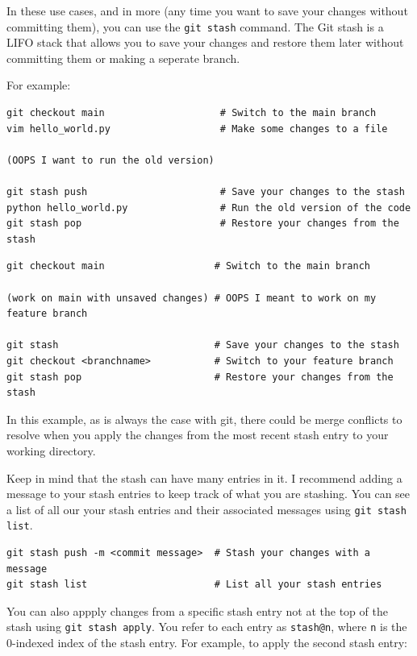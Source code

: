 \documentclass[fleqn]{article}
\begin{document}
In these use cases, and in more (any time you want to save your changes without
committing them), you can use the \texttt{git stash} command. The Git stash is 
a LIFO stack that allows you to save your changes and restore them later
without committing them or making a seperate branch.

For example:

\begin{lstlisting}
git checkout main                    # Switch to the main branch
vim hello_world.py                   # Make some changes to a file

(OOPS I want to run the old version)

git stash push                       # Save your changes to the stash
python hello_world.py                # Run the old version of the code
git stash pop                        # Restore your changes from the stash
\end{lstlisting}

\begin{lstlisting}
git checkout main                   # Switch to the main branch

(work on main with unsaved changes) # OOPS I meant to work on my feature branch

git stash                           # Save your changes to the stash
git checkout <branchname>           # Switch to your feature branch
git stash pop                       # Restore your changes from the stash
\end{lstlisting}

In this example, as is always the case with git, there could be merge conflicts
to resolve when you apply the changes from the most recent stash entry to your
working directory.

Keep in mind that the stash can have many entries in it. I recommend adding a
message to your stash entries to keep track of what you are stashing. You can 
see a list of all our your stash entries and their associated messages using
\texttt{git stash list}.

\begin{lstlisting}
git stash push -m <commit message>  # Stash your changes with a message
git stash list                      # List all your stash entries
\end{lstlisting}

You can also appply changes from a specific stash entry not at the top of the
stash using \texttt{git stash apply}. You refer to each entry as
\texttt{stash@n}, where \texttt{n} is the 0-indexed index of the stash entry.
For example, to apply the second stash entry:
\end{document}
